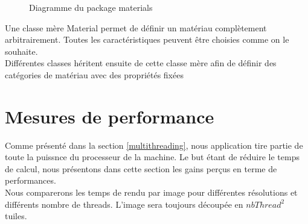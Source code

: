 \documentclass[11pt]{article}
\begin{document}
\begin{figure}[h!]
	
	\caption{Diagramme du package materials}
	\label{diagrammePackageMaterials}
\end{figure}
\FloatBarrier

Une classe mère Material permet de définir un matériau complètement arbitrairement. Toutes les caractéristiques peuvent être choisies comme on le souhaite.\\
Différentes classes héritent ensuite de cette classe mère afin de définir des catégories de matériau avec des propriétés fixées

\section{Mesures de performance}
Comme présenté dans la section \ref{multithreading}, nous application tire partie de toute la puissnce du processeur de la machine. Le but étant de réduire le temps de calcul, nous présentons dans cette section les gains perçus en terme de performances.\\
Nous comparerons les temps de rendu par image pour différentes résolutions et différents nombre de threads. L'image sera toujours découpée en $nbThread^2$ tuiles.
\end{document}
